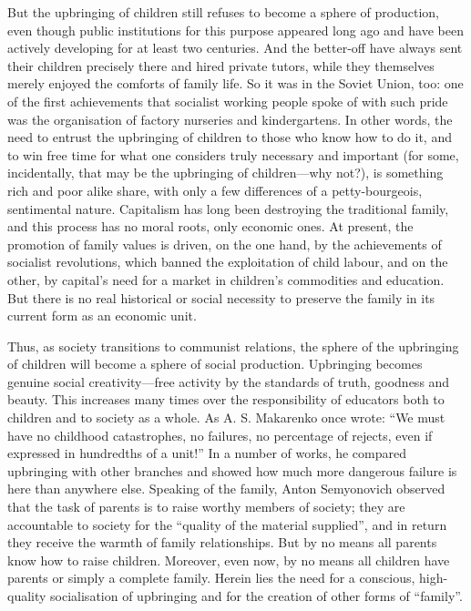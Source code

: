 \documentclass[../main]{subfiles}
\begin{document}
But the upbringing of children still refuses to become a sphere of production, even though public institutions for this purpose appeared long ago and have been actively developing for at least two centuries. And the better-off have always sent their children precisely there and hired private tutors, while they themselves merely enjoyed the comforts of family life. So it was in the Soviet Union, too: one of the first achievements that socialist working people spoke of with such pride was the organisation of factory nurseries and kindergartens. In other words, the need to entrust the upbringing of children to those who know how to do it, and to win free time for what one considers truly necessary and important (for some, incidentally, that may be the upbringing of children—why not?), is something rich and poor alike share, with only a few differences of a petty-bourgeois, sentimental nature. Capitalism has long been destroying the traditional family, and this process has no moral roots, only economic ones. At present, the promotion of family values is driven, on the one hand, by the achievements of socialist revolutions, which banned the exploitation of child labour, and on the other, by capital’s need for a market in children’s commodities and education. But there is no real historical or social necessity to preserve the family in its current form as an economic unit.

Thus, as society transitions to communist relations, the sphere of the upbringing of children will become a sphere of social production. Upbringing becomes genuine social creativity—free activity by the standards of truth, goodness and beauty. This increases many times over the responsibility of educators both to children and to society as a whole. As A. S. Makarenko once wrote: “We must have no childhood catastrophes, no failures, no percentage of rejects, even if expressed in hundredths of a unit!” In a number of works, he compared upbringing with other branches and showed how much more dangerous failure is here than anywhere else. Speaking of the family, Anton Semyonovich observed that the task of parents is to raise worthy members of society; they are accountable to society for the “quality of the material supplied”, and in return they receive the warmth of family relationships. But by no means all parents know how to raise children. Moreover, even now, by no means all children have parents or simply a complete family. Herein lies the need for a conscious, high-quality socialisation of upbringing and for the creation of other forms of “family”.
\end{document}
